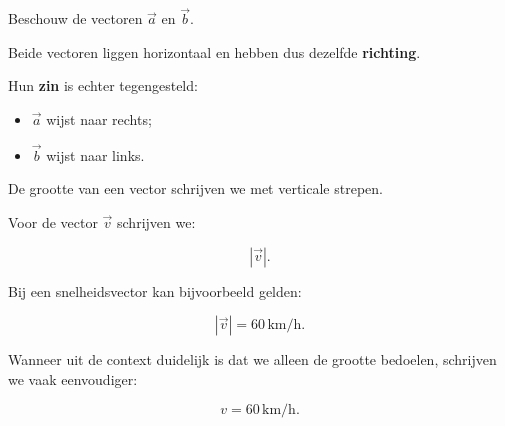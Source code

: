 \documentclass{ximera}
\begin{document}
\begin{voorbeeld}

Beschouw de vectoren $\vec{a}$ en $\vec{b}$.

\begin{center}
\end{center}

Beide vectoren liggen horizontaal en hebben dus dezelfde
\textbf{richting}.

Hun \textbf{zin} is echter tegengesteld:

\begin{itemize}
    \item $\vec{a}$ wijst naar rechts;
    \item $\vec{b}$ wijst naar links.
\end{itemize}

\end{voorbeeld}



De grootte van een vector schrijven we met verticale strepen.

Voor de vector $\vec{v}$ schrijven we:

\[
|\vec{v}|.
\]

Bij een snelheidsvector kan bijvoorbeeld gelden:

\[
|\vec{v}| = 60\,\si{\kilo\meter\per\hour}.
\]

Wanneer uit de context duidelijk is dat we alleen de grootte bedoelen,
schrijven we vaak eenvoudiger:

\[
v = 60\,\si{\kilo\meter\per\hour}.
\]
\end{document}

